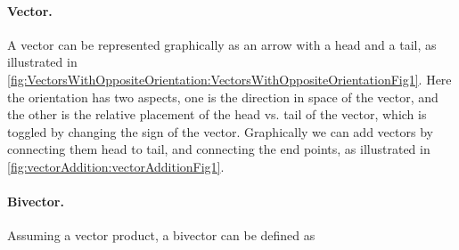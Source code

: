 \paragraph{Vector.}
A vector can be represented graphically as an arrow with a head and a tail, as illustrated in
\cref{fig:VectorsWithOppositeOrientation:VectorsWithOppositeOrientationFig1}.
Here the orientation has two aspects, one is the direction in space of the vector, and the other is the relative placement of the head vs. tail of the vector, which is toggled by changing the sign of the vector.
Graphically we can add vectors by connecting them head to tail, and connecting the end points, as illustrated in
\cref{fig:vectorAddition:vectorAdditionFig1}.

\paragraph{Bivector.}

Assuming a vector product, a bivector can be defined as


